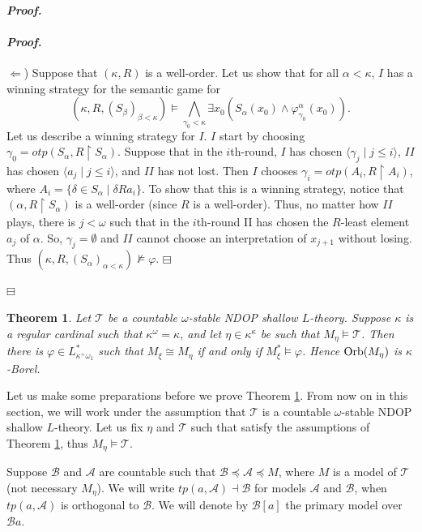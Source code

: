\documentclass[12pt,a4paper]{amsart}
\newtheorem{thm}{Theorem}[section]
\theoremstyle{definition}
\theoremstyle{remark}
\renewcommand{\mid}{\mathrel{|}\allowbreak}
\renewcommand{\restriction}{\mathbin\upharpoonright}
\newenvironment{cproof}{\paragraph{\emph{Proof.\,}}}{\hfill{$\boxminus$}\par\vspace{2mm}}
\def\Orb{\mbox{\rm Orb}}
\begin{document}
\begin{cproof}
\begin{cproof}
        $\Leftarrow$) Suppose that $(\kappa,R)$ is a well-order. Let us show that for all $\alpha<\kappa$, $I$ has a winning strategy for the  semantic game for $$(\kappa,R,(S_\beta)_{\beta<\kappa})\models \bigwedge_{\gamma_0<\kappa} \exists x_0(S_\alpha(x_0)\wedge \varphi^\alpha_{\gamma_0}(x_0)).$$
        Let us describe a winning strategy for $I$. $I$ start by choosing $\gamma_0=otp(S_\alpha,R\restriction S_\alpha)$. Suppose that in the $i$th-round, $I$ has chosen $\langle\gamma_j\mid j\leq i\rangle$, $II$ has chosen $\langle a_j\mid j\leq i\rangle$, and $II$ has not lost. Then $I$ chooses $\gamma_i=otp(A_i,R\restriction A_i)$, where $A_i=\{\delta\in S_\alpha\mid \delta R a_i\}$. 
        To show that this is a winning strategy, notice that $(\alpha,R\restriction S_\alpha)$ is a well-order (since $R$ is a well-order). Thus, no  matter how $II$ plays, there is $j<\omega$ such that in the $i$th-round II has chosen   the $R$-least element $a_j$ of $\alpha$. So, $\gamma_j=\emptyset$ and $II$ cannot choose an interpretation of $x_{j+1}$ without losing. Thus $(\kappa,R,(S_\alpha)_{\alpha<\kappa})\not\models \varphi$.
    \end{cproof}
\end{cproof}

\begin{thm}\label{orbit_thm}
Let $\mathcal{T}$ be a countable $\omega$-stable NDOP shallow $L$-theory. Suppose $\kappa$ is a regular cardinal such that $\kappa^\omega=\kappa$, and let $\eta\in \kappa^\kappa$ be such that $M_\eta\models \mathcal{T}$. Then there is $\varphi\in L^*_{\kappa^+\omega_1}$ such that $M_\xi\cong M_\eta$ if and only if $M_\xi^*\models\varphi$. Hence $\Orb(M_\eta)$ is $\kappa$-Borel. 
\end{thm}

Let us make some preparations before we prove Theorem \ref{orbit_thm}. From now on in this section, we will work under the assumption that $\mathcal{T}$ is a countable $\omega$-stable NDOP shallow $L$-theory. Let us fix $\eta$ and $\mathcal{T}$ such that satisfy the assumptions of Theorem \ref{orbit_thm}, thus $M_\eta\models \mathcal{T}$. 

Suppose $\mathcal{B}$ and $\mathcal{A}$ are countable such that $\mathcal{B}\preceq\mathcal{A}\preceq M$, where $M$ is a model of $\mathcal{T}$ (not necessary $M_\eta$). 
We will write $tp(a,\mathcal{A})\dashv\mathcal{B}$ for models $\mathcal{A}$ and $\mathcal{B}$, when $tp(a,\mathcal{A})$ is orthogonal to $\mathcal{B}$. We will denote by $\mathcal{B}[a]$ the primary model over $\mathcal{B}a$.
\end{document}
